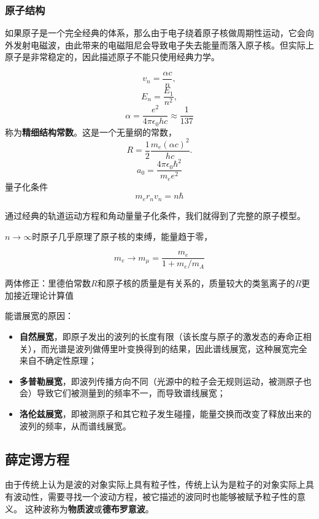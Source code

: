 \documentclass[UTF8, a4paper]{ctexart}
\begin{document}
\subsubsection{原子结构}

如果原子是一个完全经典的体系，那么由于电子绕着原子核做周期性运动，它会向外发射电磁波，由此带来的电磁阻尼会导致电子失去能量而落入原子核。但实际上原子是非常稳定的，因此描述原子不能只使用经典力学。

\[
    v_n = \frac{\alpha c}{n},
\]
\[
    E_n = \frac{E_1}{n^2},
\]
\begin{equation}
    \alpha = \frac{e^2}{4\pi \epsilon_0 h c} \approx \frac{1}{137}
\end{equation}
称为\textbf{精细结构常数}。这是一个无量纲的常数，
\[
    R = \frac{1}{2} \frac{m_e (\alpha c)^2}{hc}.
\]
\[
    a_0 = \frac{4\pi\epsilon_0 \hbar^2}{m_e e^2}
\]
量子化条件
\begin{equation}
    m_e r_n v_n = n \hbar
\end{equation}

通过经典的轨道运动方程和角动量量子化条件，我们就得到了完整的原子模型。

$n\to\infty$时原子几乎原理了原子核的束缚，能量趋于零，

\[
    m_e \longrightarrow m_\mu = \frac{m_e}{1 + m_e/m_A}
\]

两体修正：里德伯常数$R$和原子核的质量是有关系的，质量较大的类氢离子的$R$更加接近理论计算值

能谱展宽的原因：
\begin{itemize}
    \item \textbf{自然展宽}，即原子发出的波列的长度有限（该长度与原子的激发态的寿命正相关），而光谱是波列做傅里叶变换得到的结果，因此谱线展宽，这种展宽完全来自不确定性原理；
    \item \textbf{多普勒展宽}，即波列传播方向不同（光源中的粒子会无规则运动，被测原子也会）导致它们被测量到的频率不一，而导致谱线展宽；
    \item \textbf{洛伦兹展宽}，即被测原子和其它粒子发生碰撞，能量交换而改变了释放出来的波列的频率，从而谱线展宽。
\end{itemize}

\subsection{薛定谔方程}

由于传统上认为是波的对象实际上具有粒子性，传统上认为是粒子的对象实际上具有波动性，需要寻找一个波动方程，被它描述的波同时也能够被赋予粒子性的意义。
这种波称为\textbf{物质波}或\textbf{德布罗意波}。
\end{document}
